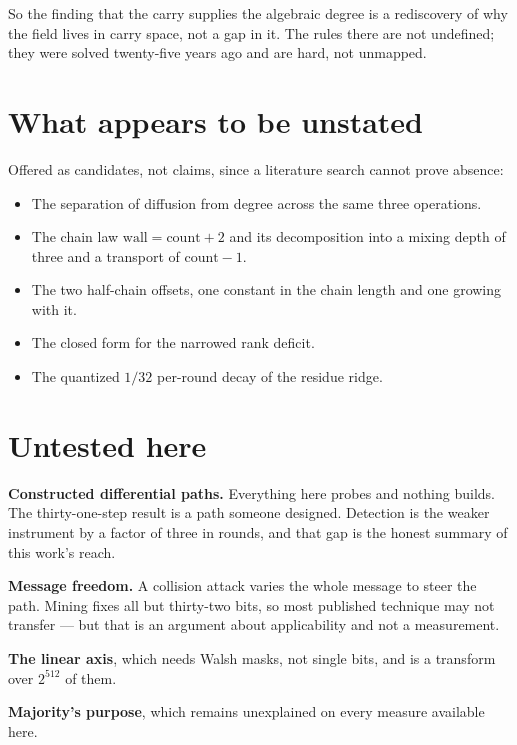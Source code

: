 So the finding that the carry supplies the algebraic degree is a rediscovery of why the field lives in carry space, not a gap in it. The rules there are not undefined; they were solved twenty-five years ago and are hard, not unmapped.

\section{What appears to be unstated}

Offered as candidates, not claims, since a literature search cannot prove absence:

\begin{itemize}
  \item The separation of diffusion from degree across the same three operations.
  \item The chain law \(\mathrm{wall} = \mathrm{count} + 2\) and its decomposition into a mixing depth of three and a transport of \(\mathrm{count} - 1\).
  \item The two half-chain offsets, one constant in the chain length and one growing with it.
  \item The closed form for the narrowed rank deficit.
  \item The quantized \(1/32\) per-round decay of the residue ridge.
\end{itemize}

\section{Untested here}

\textbf{Constructed differential paths.} Everything here probes and nothing builds. The thirty-one-step result is a path someone designed. Detection is the weaker instrument by a factor of three in rounds, and that gap is the honest summary of this work's reach.

\textbf{Message freedom.} A collision attack varies the whole message to steer the path. Mining fixes all but thirty-two bits, so most published technique may not transfer --- but that is an argument about applicability and not a measurement.

\textbf{The linear axis}, which needs Walsh masks, not single bits, and is a transform over \(2^{512}\) of them.

\textbf{Majority's purpose}, which remains unexplained on every measure available here.
